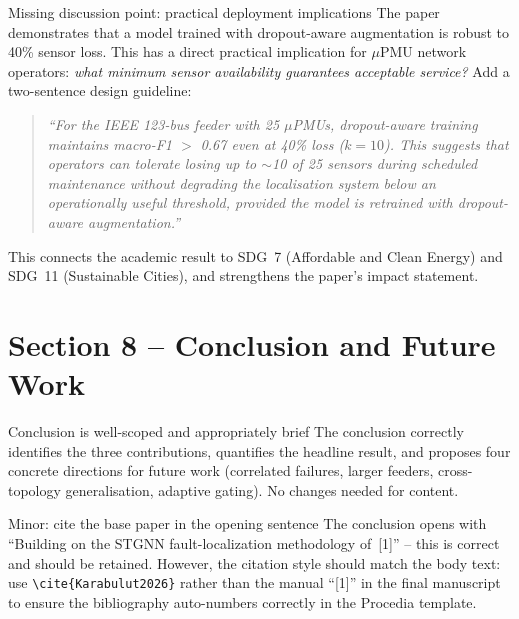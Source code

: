 \documentclass[11pt,a4paper]{article}
\begin{document}
\begin{warnbox}{Missing discussion point: practical deployment implications}
The paper demonstrates that a model trained with dropout-aware augmentation
is robust to 40\% sensor loss. This has a direct practical implication for
$\mu$PMU network operators: \emph{what minimum sensor availability guarantees
acceptable service?} Add a two-sentence design guideline:
\begin{quote}
\textit{``For the IEEE 123-bus feeder with 25 $\mu$PMUs, dropout-aware training
maintains macro-F1 $>$ 0.67 even at 40\% loss ($k{=}10$). This suggests that
operators can tolerate losing up to $\sim$10 of 25 sensors during scheduled
maintenance without degrading the localisation system below an operationally
useful threshold, provided the model is retrained with dropout-aware
augmentation.''}
\end{quote}
This connects the academic result to SDG~7 (Affordable and Clean Energy) and
SDG~11 (Sustainable Cities), and strengthens the paper's impact statement.
\end{warnbox}

\section{Section 8 -- Conclusion and Future Work}

\begin{okbox}{Conclusion is well-scoped and appropriately brief}
The conclusion correctly identifies the three contributions, quantifies the
headline result, and proposes four concrete directions for future work (correlated
failures, larger feeders, cross-topology generalisation, adaptive gating). No
changes needed for content.
\end{okbox}

\begin{suggestbox}{Minor: cite the base paper in the opening sentence}
The conclusion opens with ``Building on the STGNN fault-localization methodology
of~[1]'' -- this is correct and should be retained. However, the citation style
should match the body text: use \texttt{\textbackslash cite\{Karabulut2026\}}
rather than the manual ``[1]'' in the final manuscript to ensure the bibliography
auto-numbers correctly in the Procedia template.
\end{suggestbox}

\end{document}
